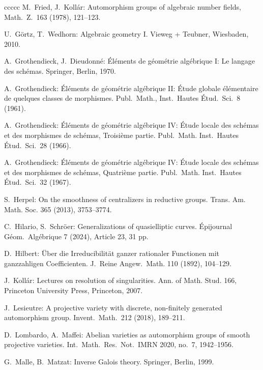 \documentclass[oneside, 12pt]{amsart}
\theoremstyle{definition}
\theoremstyle{remark}
\begin{document}
\begin{thebibliography}{ccccc}
M.\ Fried, J.\ Koll\'ar:
Automorphism groups of algebraic number fields,
Math.\ Z.\ 163 (1978),  121--123.

U.\ G\"ortz, T.\ Wedhorn:
Algebraic geometry I.
Vieweg + Teubner, Wiesbaden, 2010.

A.\ Grothendieck, J.\ Dieudonn\'e:
\'El\'ements de g\'eom\'etrie alg\'ebrique I:
Le langage des sch\'emas.
Springer, Berlin, 1970.

A.\ Grothendieck:
\'El\'ements de g\'eom\'etrie alg\'ebrique II:
\'Etude globale \'el\'ementaire de quelques classes de morphismes.
Publ.\ Math., Inst.\ Hautes \'Etud.\ Sci.\ 8 (1961).

A.\ Grothendieck:
\'El\'ements de g\'eom\'etrie alg\'ebrique IV: 
\'Etude locale des sch\'emas et des morphismes de sch\'emas,
Troisi\`eme partie.
Publ.\ Math. Inst.\ Hautes \'Etud.\ Sci.\  28 (1966).

A.\ Grothendieck:
\'El\'ements de g\'eom\'etrie alg\'ebrique IV: 
\'Etude locale des sch\'emas et des morphismes de sch\'emas,
Quatri\`eme partie.
Publ.\ Math. Inst.\ Hautes \'Etud.\ Sci.\  32 (1967).

S.\ Herpel:
On the smoothness of centralizers in reductive groups. 
Trans. Am. Math. Soc. 365 (2013), 3753--3774.

C.\ Hilario, S.\ Schr\"oer:
Generalizations of quasielliptic curves.  
\'Epijournal G\'eom.\ Alg\'ebrique 7 (2024), Article 23, 31 pp.

D.\ Hilbert:
\"Uber die Irreducibilit\"at ganzer rationaler Functionen mit ganzzahligen Coefficienten. 
J.\ Reine Angew.\ Math. 110 (1892), 104--129.  

J.\ Koll\'ar: 
Lectures on resolution of singularities.
Ann. of Math. Stud. 166, 
Princeton University Press, Princeton, 2007.

J.\ Lesieutre:
A projective variety with discrete, non-finitely generated automorphism group.  
Invent.\ Math.\ 212 (2018),  189--211. 

D.\ Lombardo, A.\ Maffei:
Abelian varieties as automorphism groups of smooth projective varieties.  
Int.\ Math.\ Res.\ Not.\ IMRN 2020, no.\ 7, 1942--1956. 

G.\ Malle, B.\ Matzat:
Inverse Galois theory. 
Springer,  Berlin, 1999.
 

\end{thebibliography}
\end{document}
